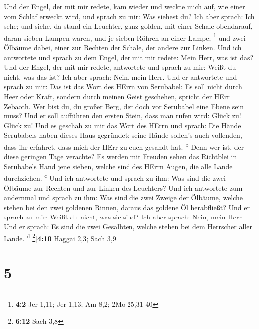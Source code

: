  Und der Engel, der mit mir redete, kam wieder und weckte
mich auf, wie einer vom Schlaf erweckt wird,  und sprach
zu mir: Was siehest du? Ich aber sprach: Ich sehe; und siehe, da stand
ein Leuchter, ganz golden, mit einer Schale obendarauf, daran sieben
Lampen waren, und je sieben Röhren an einer Lampe; \footnote{\textbf{4:2}
  Jer 1,11; Jer 1,13; Am 8,2; 2Mo 25,31-40}  und zwei
Ölbäume dabei, einer zur Rechten der Schale, der andere zur Linken.
 Und ich antwortete und sprach zu dem Engel, der mit mir
redete: Mein Herr, was ist das?  Und der Engel, der mit
mir redete, antwortete und sprach zu mir: Weißt du nicht, was das ist?
Ich aber sprach: Nein, mein Herr.  Und er antwortete und
sprach zu mir: Das ist das Wort des HErrn von Serubabel: Es soll nicht
durch Heer oder Kraft, sondern durch meinen Geist geschehen, spricht der
HErr Zebaoth.  Wer bist du, du großer Berg, der doch vor
Serubabel eine Ebene sein muss? Und er soll aufführen den ersten Stein,
dass man rufen wird: Glück zu! Glück zu!  Und es geschah
zu mir das Wort des HErrn und sprach:  Die Hände
Serubabels haben dieses Haus gegründet; seine Hände sollen's auch
vollenden, dass ihr erfahret, dass mich der HErr zu euch gesandt hat.
\textsuperscript{b}  Denn wer ist, der diese geringen
Tage verachte? Es werden mit Freuden sehen das Richtblei in Serubabels
Hand jene sieben, welche sind des HErrn Augen, die alle Lande
durchziehen. \textsuperscript{c}  Und ich antwortete und
sprach zu ihm: Was sind die zwei Ölbäume zur Rechten und zur Linken des
Leuchters?  Und ich antwortete zum andernmal und sprach
zu ihm: Was sind die zwei Zweige der Ölbäume, welche stehen bei den zwei
goldenen Rinnen, daraus das goldene Öl herabfließt?  Und
er sprach zu mir: Weißt du nicht, was sie sind? Ich aber sprach: Nein,
mein Herr.  Und er sprach: Es sind die zwei Gesalbten,
welche stehen bei dem Herrscher aller Lande. \textsuperscript{d}
\footnote{\textbf{6:12} Sach 3,8}{[}\textbf{4:10} Haggai 2,3; Sach
3,9{]}

\hypertarget{section-4}{%
\section{5}\label{section-4}}

